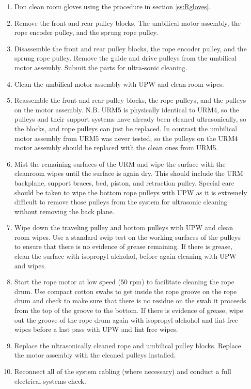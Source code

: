 \documentclass[11pt]{article}
\begin{document}
\begin{enumerate}[label=$\square$]
\item Don clean room gloves using the procedure in section
  \ref{ss:Rgloves}.
\item Remove the front and rear pulley blocks, The umbilical motor
  assembly, the rope encoder pulley, and the sprung rope pulley.
\item Disassemble the front and rear pulley blocks, the rope encoder
  pulley, and the sprung rope pulley. Remove the guide and drive
  pulleys from the umbilical motor assembly. Submit the parts for
  ultra-sonic cleaning.
\item Clean the umbilical motor assembly with UPW and clean room
  wipes.
\item Reassemble the front and rear pulley blocks, the rope pulleys,
  and the pulleys on the motor assembly. N.B. URM5 is physically
  identical to URM4, so the pulleys and their support systems have
  already been cleaned ultrasonically, so the blocks, and rope pulleys
  can just be replaced. In contrast the umbilical motor assembly from
  URM5 was never tested, so the pulleys on the URM4 motor assembly
  should be replaced with the clean ones from URM5.
\item Mist the remaining surfaces of the URM and wipe the surface with
  the cleanroom wipes until the surface is again dry. This should
  include the URM backplane, support braces, bed, piston, and
  retraction pulley. Special care should be taken to wipe the bottom
  rope pulleys with UPW as it is extremely difficult to remove those
  pulleys from the system for ultrasonic cleaning without removing the
  back plane.
\item Wipe down the traveling pulley and bottom pulleys with UPW and
  clean room wipes. Use a standard swip test on the working surfaces
  of the pulleys to ensure that there is no evidence of grease
  remaining. If there is grease, clean the surface with isopropyl
  alchohol, before again cleaning with UPW and wipes.
\item Start the rope motor at low speed (50 rpm) to facilitate
  cleaning the rope drum. Use compact cotton swabs to get inside the
  rope groove on the rope drum and check to make sure that there is no
  residue on the swab it proceeds from the top of the groove to the
  bottom. If there is evidence of grease, wipe out the groove of the
  rope drum again with isopropyl alchohol and lint free wipes before a
  last pass with UPW and lint free wipes.
\item Replace the ultrasonically cleaned rope and umbilical pulley
  blocks. Replace the motor assembly with the cleaned pulleys
  installed.
\item Reconnect all of the system cabling (where necessary) and
  conduct a full electrical systems check.
\end{enumerate}
\end{document}
